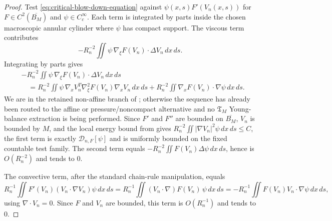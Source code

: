 \documentclass[11pt]{amsart}
\numberwithin{equation}{section}
\theoremstyle{plain}
\theoremstyle{definition}
\theoremstyle{remark}
\newcommand{\Tcrit}{\mathfrak T_M}
\begin{document}
\begin{proof}
Test \eqref{eq:critical-blow-down-equation} against \(\psi(x,s)F'(V_n(x,s))\)
for \(F\in C^2(\overline{B_M})\) and \(\psi\in C_c^\infty\).  Each term is
integrated by parts inside the chosen macroscopic annular cylinder where
\(\psi\) has compact support.  The viscous term contributes
\[
   -R_n^{-2}\iint \psi\,\nabla_\xi F(V_n)\cdot\Delta V_n\,dx\,ds .
\]
Integrating by parts gives
\[
\begin{aligned}
&-R_n^{-2}\iint \psi\,\nabla_\xi F(V_n)\cdot\Delta V_n\,dx\,ds \\
&\quad =
R_n^{-2}\iint
\psi\,\nabla_xV_n^T\nabla_\xi^2F(V_n)\nabla_xV_n\,dx\,ds
+
R_n^{-2}\iint
\nabla_xF(V_n)\cdot\nabla\psi\,dx\,ds .
\end{aligned}
\]
We are in the retained non-affine branch of
; otherwise the sequence has already been
routed to the affine or pressure/noncompact alternative and no \(\Tcrit\)
Young-balance extraction is being performed.  Since \(F'\) and \(F''\) are
bounded on \(\overline{B_M}\), \(V_n\) is bounded by \(M\), and the local energy
bound from
 gives \(R_n^{-2}\iint
|\nabla V_n|^2\psi\,dx\,ds\le C\), the first term is exactly
\(\mathscr D_{n,F}[\psi]\) and is uniformly bounded on the fixed countable test
family.  The second term equals
\(-R_n^{-2}\iint F(V_n)\Delta\psi\,dx\,ds\), hence is \(O(R_n^{-2})\) and
tends to \(0\).

The convective term, after the standard chain-rule manipulation, equals
\[
   R_n^{-1}\!\iint F'(V_n)(V_n\cdot\nabla V_n)\psi\,dx\,ds
   =R_n^{-1}\!\iint (V_n\cdot\nabla)F(V_n)\,\psi\,dx\,ds
   =-R_n^{-1}\!\iint F(V_n)V_n\cdot\nabla\psi\,dx\,ds ,
\]
using \(\nabla\cdot V_n=0\).  Since \(F\) and \(V_n\) are bounded, this term
is \(O(R_n^{-1})\) and tends to \(0\).


\end{proof}
\end{document}

